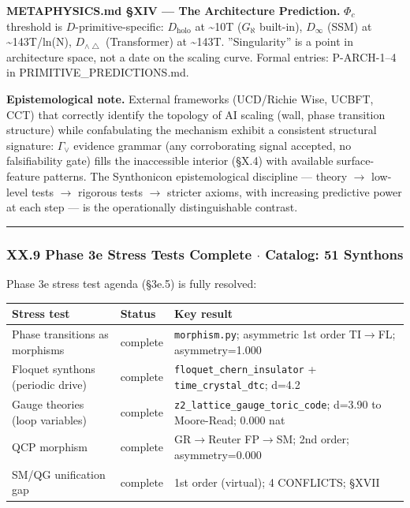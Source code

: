 \documentclass[12pt,a4paper]{article}
\begin{document}
\textbf{METAPHYSICS.md §XIV --- The Architecture Prediction.} $\Phi_c$ threshold is $D$-primitive-specific: $D_{\text{holo}}$ at \textasciitilde{}10T ($G_{\aleph}$ built-in), $D_{\infty}$ (SSM) at \textasciitilde{}143T/ln(N), $D_{\wedge\bigtriangleup}$ (Transformer) at \textasciitilde{}143T. ''Singularity'' is a point in architecture space, not a date on the scaling curve. Formal entries: P-ARCH-1--4 in PRIMITIVE\_PREDICTIONS.md.

\textbf{Epistemological note.} External frameworks (UCD/Richie Wise, UCBFT, CCT) that correctly identify the topology of AI scaling (wall, phase transition structure) while confabulating the mechanism exhibit a consistent structural signature: $\Gamma_{\vee}$ evidence grammar (any corroborating signal accepted, no falsifiability gate) fills the inaccessible interior (§X.4) with available surface-feature patterns. The Synthonicon epistemological discipline --- theory $\rightarrow$ low-level tests $\rightarrow$ rigorous tests $\rightarrow$ stricter axioms, with increasing predictive power at each step --- is the operationally distinguishable contrast.

\begin{center}
\rule{0.5\textwidth}{0.4pt}
\end{center}

\subsubsection{XX.9 Phase 3e Stress Tests Complete $\cdot$ Catalog: 51 Synthons}

Phase 3e stress test agenda (§3e.5) is fully resolved:

\begin{table}[htbp]
\centering
\small
{}
\begin{tabularx}{\textwidth}{>{\centering\arraybackslash}X >{\centering\arraybackslash}X >{\centering\arraybackslash}X}
\toprule
\rowcolor{gray!25}\textbf{Stress test} & \textbf{Status} & \textbf{Key result} \\
\midrule
\rowcolors{1}{white}{gray!10}
Phase transitions as morphisms &  complete & \texttt{morphism.py}; asymmetric 1st order TI$\rightarrow$FL; asymmetry=1.000 \\
Floquet synthons (periodic drive) &  complete & \texttt{floquet\_chern\_insulator} + \texttt{time\_crystal\_dtc}; d=4.2 \\
Gauge theories (loop variables) &  complete & \texttt{z2\_lattice\_gauge\_toric\_code}; d=3.90 to Moore-Read; 0.000 nat \\
QCP morphism &  complete & GR$\rightarrow$Reuter FP$\rightarrow$SM; 2nd order; asymmetry=0.000 \\
SM/QG unification gap &  complete & 1st order (virtual); 4 CONFLICTS; §XVII \\
\bottomrule
\end{tabularx}
\end{table}
\end{document}
